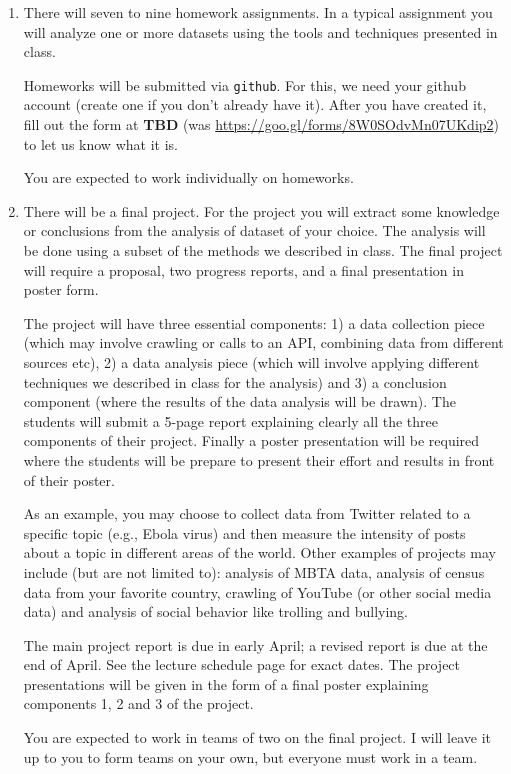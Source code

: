 \documentclass[11pt]{article}
\begin{document}
\begin{enumerate}
\item There will seven to nine homework assignments.  In a typical 
assignment you will 
analyze one or more datasets using the tools and techniques presented in
class.

Homeworks will be submitted via \texttt{github}.   For this, we
  need your github account (create one if you don't already have it).
  After you have created it, fill out the form at \textbf{TBD}
  (was \url{https://goo.gl/forms/8W0SOdvMn07UKdip2}) to let us know what it is.

You are expected to work individually on homeworks.

\item There will be a final project.  For the project you
  will extract some
knowledge or conclusions from the analysis of dataset of your choice. The analysis
will be done using a subset of the methods we described in class.  The
final project will require a proposal, two progress reports, and a final
presentation in poster form.

The project will have three essential components: 1) a data collection
piece (which may involve crawling or calls to an API, combining data
from different sources etc), 2) a data analysis piece (which will
involve applying different techniques we described in class for the
analysis) and 3) a conclusion component (where the results of the data
analysis will be drawn).  The students will submit a 5-page report
explaining clearly all the three components of their project. Finally a
poster presentation will be required where the students will be prepare
to present their effort and results in front of their poster. 

As an example, you may choose to collect data from Twitter related to
a specific topic (e.g., Ebola virus) and then measure the intensity of
posts about a topic in different areas of the world.  Other examples
of projects may include (but are not limited to): analysis of MBTA
data, analysis of census data from your favorite country, crawling of
YouTube (or other social media data) and analysis of social behavior
like trolling and bullying.

The main project report is due in early April; a revised report is due
at the end of April. See the lecture schedule page for exact dates. The project
presentations will be given in the form of a final poster explaining
components 1, 2 and 3 of the project.

You are expected to work in teams of two on the final project.   I will
leave it up to you to form teams on your own, but everyone must work in
a team.

\end{enumerate}
\end{document}
